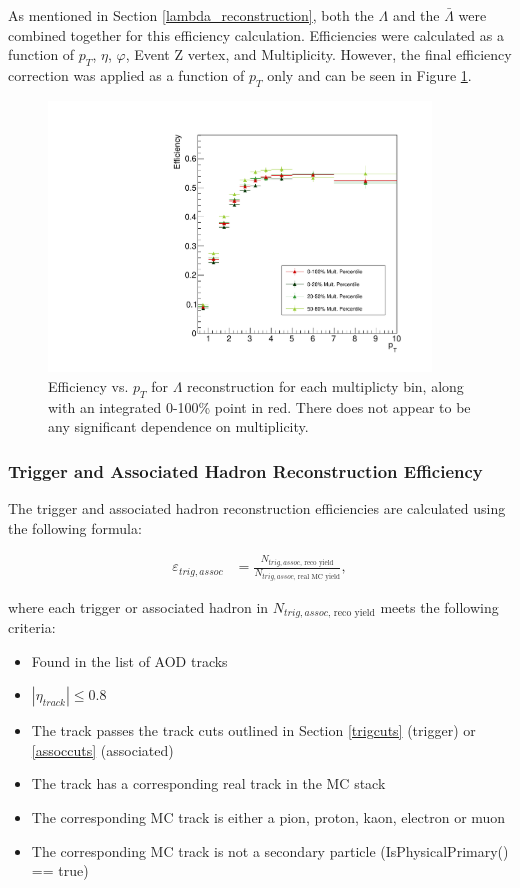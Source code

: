 \documentclass[ALICE,manyauthors]{ALICE_analysis_notes}
\begin{document}
\begin{itemize}
As mentioned in Section \ref{lambda_reconstruction}, both the $\Lambda$ and the $\bar{\Lambda}$ were combined together for this efficiency calculation. Efficiencies were calculated as a function of $p_T$, $\eta$, $\varphi$, Event Z vertex, and Multiplicity. However, the final efficiency correction was applied as a function of $p_T$ only and can be seen in Figure \ref{lambda_eff}.

\begin{figure}[ht]
\centering
\includegraphics[width=4in]{figures/v0_efficiency.pdf}
\caption{Efficiency vs. $p_T$ for $\Lambda$ reconstruction for each multiplicty bin, along with an integrated 0-100\% point in red. There does not appear to be any significant dependence on multiplicity.}
\label{lambda_eff}
\end{figure}

\subsubsection{Trigger and Associated Hadron Reconstruction Efficiency}
\label{trigassoc_efficiency}

The trigger and associated hadron reconstruction efficiencies are calculated using the following formula:

\begin{align*}
	\varepsilon_{trig, assoc} &=  \frac{N_{trig, assoc\text{, reco yield}}}{N_{trig, assoc\text{, real MC yield}}},
\end{align*}

where each trigger or associated hadron in $N_{trig, assoc\text{, reco yield}}$ meets the following criteria:

\begin{itemize}
	\item Found in the list of AOD tracks
	\item $|\eta_{track}| \leq 0.8$
	\item The track passes the track cuts outlined in Section \ref{trigcuts} (trigger) or \ref{assoccuts} (associated)
	\item The track has a corresponding real track in the MC stack
	\item The corresponding MC track is either a pion, proton, kaon, electron or muon
	\item The corresponding MC track is not a secondary particle (IsPhysicalPrimary() == true)
\end{itemize}


\end{itemize}
\end{document}
